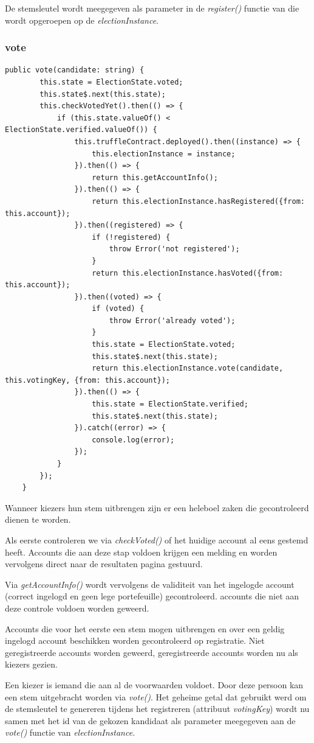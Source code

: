 		De stemsleutel wordt meegegeven als parameter in de \textit{register()} functie van die wordt opgeroepen op de \textit{electionInstance}.
	\subsubsection{vote}
	\lstset{language=JavaScriptSolidity} 
	\begin{lstlisting}[numbers=none]
	public vote(candidate: string) {
		this.state = ElectionState.voted;
		this.state$.next(this.state);
		this.checkVotedYet().then(() => {
			if (this.state.valueOf() < ElectionState.verified.valueOf()) {
				this.truffleContract.deployed().then((instance) => {
					this.electionInstance = instance;
				}).then(() => {
					return this.getAccountInfo();
				}).then(() => {
					return this.electionInstance.hasRegistered({from: this.account});
				}).then((registered) => {
					if (!registered) {
						throw Error('not registered');
					}
					return this.electionInstance.hasVoted({from: this.account});
				}).then((voted) => {
					if (voted) {
						throw Error('already voted');
					}
					this.state = ElectionState.voted;
					this.state$.next(this.state);
					return this.electionInstance.vote(candidate, this.votingKey, {from: this.account});
				}).then(() => {
					this.state = ElectionState.verified;
					this.state$.next(this.state);
				}).catch((error) => {
					console.log(error);
				});
			}
		});
	}
	\end{lstlisting}
	Wanneer kiezers hun stem uitbrengen zijn er een heleboel zaken die gecontroleerd dienen te worden. 
	
	Als eerste controleren we via \textit{checkVoted()} of het huidige account al eens gestemd heeft. Accounts die aan deze stap voldoen krijgen een melding en worden vervolgens direct naar de resultaten pagina gestuurd.
	
	Via \textit{getAccountInfo()} wordt vervolgens de validiteit van het ingelogde account (correct ingelogd en geen lege portefeuille) gecontroleerd. accounts die niet aan deze controle voldoen worden geweerd. 
	
	Accounts die voor het eerste een stem mogen uitbrengen en over een geldig ingelogd account beschikken worden gecontroleerd op registratie. Niet geregistreerde accounts worden geweerd, geregistreerde accounts worden nu als kiezers gezien.
	
	Een kiezer is iemand die aan al de voorwaarden voldoet. Door deze persoon kan een stem uitgebracht worden via \textit{vote()}. Het geheime getal dat gebruikt werd om de stemsleutel te genereren tijdens het registreren (attribuut \textit{votingKey}) wordt nu samen met het id van de gekozen kandidaat als parameter meegegeven aan de \textit{vote()} functie van \textit{electionInstance}.
